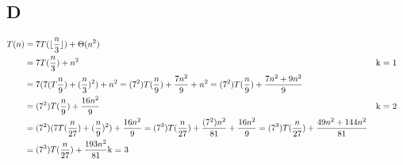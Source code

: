 \subsection*{D}
\begin{equation}
  \begin{aligned}
    T(n) &= 7T(\lfloor\frac{n}{3}\rfloor) + \Theta(n^2) \\
    &= 7T(\frac{n}{3}) + n^2  && \text{k = 1} \\
    &= 7(7(T\frac{n}{9}) + (\frac{n}{3})^2) + n^2 = (7^2)T(\frac{n}{9}) + \frac{7n^2}{9} + n^2 = (7^2)T(\frac{n}{9}) + \frac{7n^2 + 9n^2}{9} \\
    &= (7^2)T(\frac{n}{9}) + \frac{16n^2}{9} && \text{k = 2} \\
    &= (7^2)(7T(\frac{n}{27}) + (\frac{n}{9})^2) + \frac{16n^2}{9}  = (7^3)T(\frac{n}{27}) + \frac{(7^2)n^2}{81} + \frac{16n^2}{9} = (7^3)T(\frac{n}{27}) + \frac{49n^2 + 144n^2}{81} \\
    &= (7^3)T(\frac{n}{27}) + \frac{193n^2}{81} \text{k = 3}\\
  \end{aligned}
\end{equation}
